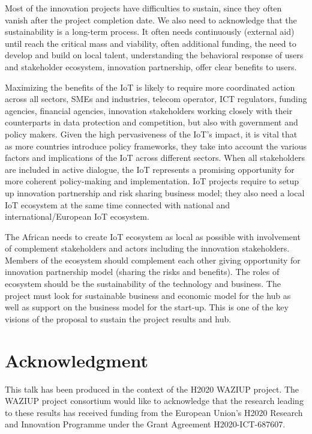 \documentclass{llncs}
\begin{document}
Most of the innovation projects have difficulties to sustain, since they often vanish after the project completion date.
We also need to acknowledge that the sustainability is a long-term process.
It often needs continuously (external aid) until reach the critical mass and viability, often additional funding, the need to develop and build on local talent, understanding the behavioral response of users and stakeholder ecosystem, innovation partnership, offer clear benefits to users.

Maximizing the benefits of the IoT is likely to require more coordinated action across all sectors, SMEs and industries, telecom operator, ICT regulators, funding agencies, financial agencies, innovation stakeholders working closely with their counterparts in data protection and competition, but also with government and policy makers.
Given the high pervasiveness of the IoT’s impact, it is vital that as more countries introduce policy frameworks, they take into account the various factors and implications of the IoT across different sectors.
When all stakeholders are included in active dialogue, the IoT represents a promising opportunity for more coherent policy-making and implementation.
IoT projects require to setup up innovation partnership and risk sharing business model; they also need a local IoT ecosystem at the same time connected with national and international/European IoT ecosystem.

The African needs to create IoT ecosystem as local as possible with involvement of complement stakeholders and actors including the innovation stakeholders.
Members of the ecosystem should complement each other giving opportunity for innovation partnership model (sharing the risks and benefits).
The roles of ecosystem should be the sustainability of the technology and business.
The project must look for sustainable business and economic model for the hub as well as support on the business model for the start-up.
This is one of the key visions of the proposal to sustain the project results and hub.

\section*{Acknowledgment}

This talk has been produced in the context of the H2020 WAZIUP project.
The WAZIUP project consortium would like to acknowledge that the research leading to these results has received funding from the European Union’s H2020 Research and Innovation Programme under the Grant Agreement H2020-ICT-687607.
\end{document}
